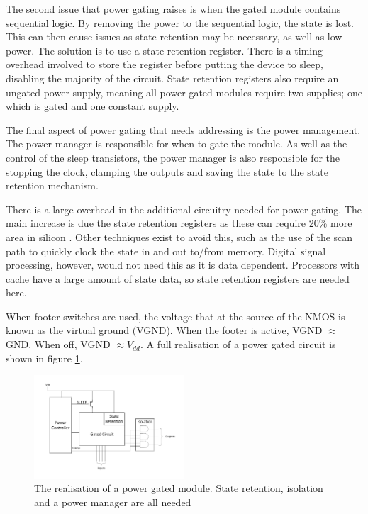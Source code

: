 The second issue that power gating raises is when the gated module contains sequential logic. 
By removing the power to the sequential logic, the state is lost. 
This can then cause issues as state retention may be necessary, as well as low power.
The solution is to use a state retention register. 
There is a timing overhead involved to store the register before putting the device to sleep, disabling the majority of the circuit. 
State retention registers also require an ungated power supply, meaning all power gated modules require two supplies; one which is gated and one constant supply.

The final aspect of power gating that needs addressing is the power management.
The power manager is responsible for when to gate the module. %
As well as the control of the sleep transistors, the power manager is also responsible for the stopping the clock, clamping the outputs and saving the state to the state retention mechanism.

There is a large overhead in the additional circuitry needed for power gating. 
The main increase is due the state retention registers as these can require 20\% more area in silicon \cite{stateretarea}. 
Other techniques exist to avoid this, such as the use of the scan path to quickly clock the state in and out to/from memory.
Digital signal processing, however, would not need this as it is data dependent. 
Processors with cache have a large amount of state data, so state retention registers are needed here.

When footer switches are used, the voltage that at the source of the NMOS is known as the virtual ground (VGND). When the footer is active, VGND $\approx$ GND. When off, VGND $\approx V_{dd}$.
A full realisation of a power gated circuit is shown in figure \ref{fig:powergated}. 


\begin{figure}
\includegraphics[width=0.5\textwidth]{Figures/powergating_full.pdf}
\caption{The realisation of a power gated module. State retention, isolation and a power manager are all needed}
\label{fig:powergated}
\end{figure}


